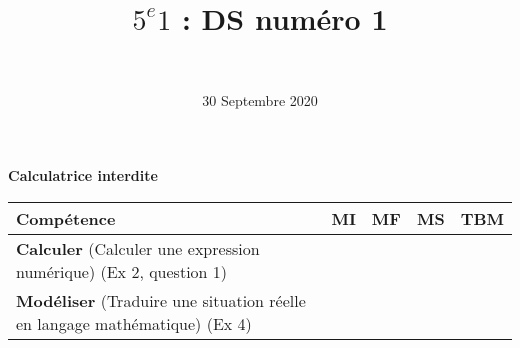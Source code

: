 \documentclass[a4paper,11pt]{exam}
\author{\ }
\date{30 Septembre 2020}
\title{$5^e 1$ : DS num\'ero 1}
\begin{document}
%	

	\maketitle
	
\begin{center}
	\textbf{Calculatrice interdite}
\end{center}

\begin{small}
	\begin{center}
		\begin{tabular}{|@{\ }l@{\ }|@{\ }c@{\ }|@{\ }c@{\ }|@{\ }c@{\ }|@{\ }c@{\ }|}
			\hline
			\textbf{Compétence} & \textbf{MI} & \textbf{MF} & \textbf{MS} & \textbf{TBM} \\
			\hline
			\textbf{Calculer} (Calculer une expression numérique) (Ex 2, question 1)&  \ \ & \ \ & \ \ & \ \  \\
			\hline	
			\textbf{Modéliser} (Traduire une situation réelle en langage mathématique) (Ex 4)& \ \ & \ \ &  \ \  & \ \ \\
			\hline
		\end{tabular}
	\end{center}
\end{small}	

	
	
	

\newpage


%





\label{LastPage}

%
\end{document}
